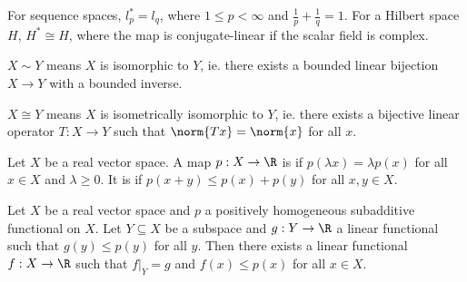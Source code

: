 \documentclass[a4paper]{article}
\begin{document}
\begin{eg}
  For sequence spaces, $l_p^*=l_q$, where $1\leq p<\infty$ and $\frac{1}{p}+\frac{1}{q}=1$. For a Hilbert space $H$, $H^*\cong H$, where the map is conjugate-linear if the scalar field is complex.
\end{eg}

\begin{notation}
  $X\sim Y$ means $X$ is isomorphic to $Y$, ie. there exists a bounded linear bijection $X\to Y$ with a bounded inverse.

  $X\cong Y$ means $X$ is isometrically isomorphic to $Y$, ie. there exists a bijective linear operator $T:X\to Y$ such that $\norm{Tx}=\norm{x}$ for all $x$.
\end{notation}

Let $X$ be a real vector space. A map $p:X\to\R$ is  if $p(\lambda x)=\lambda p(x)$ for all $x\in X$ and $\lambda\geq 0$. It is  if $p(x+y)\leq p(x)+p(y)$ for all $x,y\in X$.

\begin{nthm}\label{thm:HahnBanach1}
  Let $X$ be a real vector space and $p$ a positively homogeneous subadditive functional on $X$. Let $Y\subseteq X$ be a subspace and $g:Y\to\R$ a linear functional such that $g(y)\leq p(y)$ for all $y$. Then there exists a linear functional $f:X\to\R$ such that $f|_Y=g$ and $f(x)\leq p(x)$ for all $x\in X$.
\end{nthm}
\end{document}
